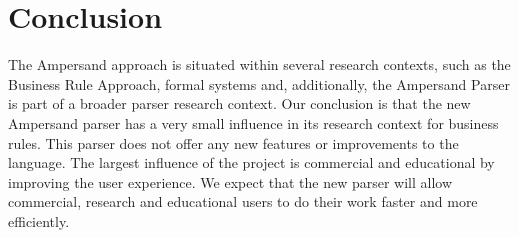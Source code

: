 
\section{Conclusion}
\label{sec:conclusion}
The Ampersand approach is situated within several research contexts, such as the Business Rule Approach, formal systems and, additionally, the Ampersand Parser is part of a broader parser research context.
Our conclusion is that the new Ampersand parser has a very small influence in its research context for business rules.
This parser does not offer any new features or improvements to the language.
The largest influence of the project is commercial and educational by improving the user experience.
We expect that the new parser will allow commercial, research and educational users to do their work faster and more efficiently.

